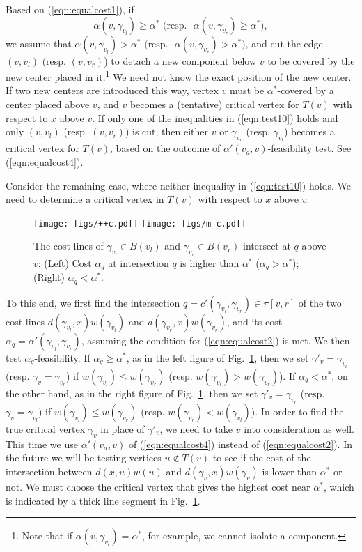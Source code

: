 \documentclass{llncs}
\begin{document}
{Based on (\ref{eqn:equalcost1}), if 
\begin{equation}\label{eqn:test10}
\alpha(v,\gamma_{v_l})  \geq  \alpha^*
\mbox{~(resp. ~}
\alpha(v,\gamma_{v_r}) \geq \alpha^*\mbox{)},
\end{equation}
we assume that $\alpha(v,\gamma_{v_l})  >  \alpha^*\mbox{~(resp. ~}
\alpha(v,\gamma_{v_r}) > \alpha^*\mbox{)}$, 
and cut the edge $(v,v_l)$ (resp. $(v,v_r)$) to detach a new component below $v$
to be covered by the new center placed in it.\footnote{Note that if
$\alpha(v,\gamma_{v_l}) =  \alpha^*$, for example,
we cannot isolate a component.}
We need not know the exact position of the new center.
If two new centers are introduced this way,
vertex $v$ must be $\alpha^*$-covered by a center placed above $v$,
and $v$ becomes a (tentative) critical vertex for $T(v)$ with respect to $x$ above $v$.
If only one of the inequalities in (\ref{eqn:test10}) holds and only $(v,v_l)$ (resp. $(v,v_r)$) is cut,
then either $v$ or $\gamma_{v_r}$ (resp. $\gamma_{v_l}$) becomes a critical vertex for $T(v)$,
based on the outcome of $\alpha'(v_a, v)$-feasibility test.
See (\ref{eqn:equalcost4}).

Consider the remaining case,
 where neither inequality in (\ref{eqn:test10}) holds.
We need to determine a critical vertex in $T(v)$ with respect to $x$ above $v$.
\begin{figure}[ht]
\centering
\texttt{[image: figs/++c.pdf]}
\texttt{[image: figs/m-c.pdf]}
\caption{The cost lines of $\gamma_{v_l} \in B(v_l)$ and $\gamma_{v_r} \in B(v_r)$ intersect at $q$
above $v$:
(Left) Cost $\alpha_q$ at intersection $q$ is higher than $\alpha^*$ ($\alpha_q>\alpha^*$); 
(Right) $\alpha_q<\alpha^*$.
}
\label{fig:++c}
\end{figure}
To this end,
we first find the intersection $q =c'(\gamma_{v_l}, \gamma_{v_r}) \in \pi[v,r]$ of the two cost lines
$d(\gamma_{v_l},x)w(\gamma_{v_l})$ and $d(\gamma_{v_r},x)w(\gamma_{v_r})$,
and its cost $\alpha_q= \alpha'(\gamma_{v_l}, \gamma_{v_r})$,
assuming the condition for
(\ref{eqn:equalcost2}) is met.
We then test $\alpha_q$-feasibility.
If $\alpha_q \geq \alpha^*$, as in the left figure of Fig.~\ref{fig:++c},
then we set $\gamma'_{v} =\gamma_{v_l}$ (resp. $\gamma_{v}=\gamma_{v_r}$)
if $w(\gamma_{v_l}) \leq w(\gamma_{v_r})$ (resp. $w(\gamma_{v_l}) > w(\gamma_{v_r})$).
If $\alpha_q < \alpha^*$, on the other hand, as in the right figure of Fig.~\ref{fig:++c},
then we set $\gamma'_{v}=\gamma_{v_r}$ (resp. $\gamma_{v}=\gamma_{v_l}$)
if $w(\gamma_{v_l}) \leq w(\gamma_{v_r})$ (resp. $w(\gamma_{v_r}) <w(\gamma_{v_l})$).
In order to find the true critical vertex $\gamma_{v}$ in place of $\gamma'_{v}$,
we need to take $v$ into consideration as well.
This time we use $\alpha'(v_a, v)$ of (\ref{eqn:equalcost4}) instead of (\ref{eqn:equalcost2}).
In the future we will be testing vertices $u \notin T(v)$ to see if the cost of the intersection 
between $d(x,u)w(u)$ and $d(\gamma_{v},x)w(\gamma_{v})$ 
is lower than $\alpha^*$ or not.
We must choose the critical vertex that gives the highest cost near $\alpha^*$,
which is indicated by a thick line segment in Fig.~\ref{fig:++c}.

}
\end{document}
